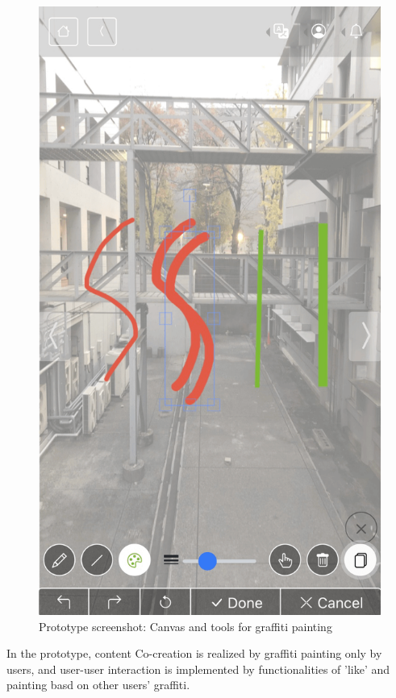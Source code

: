 \begin{figure}
\begin{minipage}{0.48\textwidth}
    \includegraphics[width=0.9\linewidth]{resources/4_methodology/prototype_canvas.png}
      \caption{Prototype screenshot: Canvas and tools for graffiti painting}
  \end{minipage}
\end{figure}

In the prototype, content Co-creation is realized by graffiti painting only by users,
and user-user interaction is implemented by functionalities of 'like' and painting basd on other users' graffiti.
